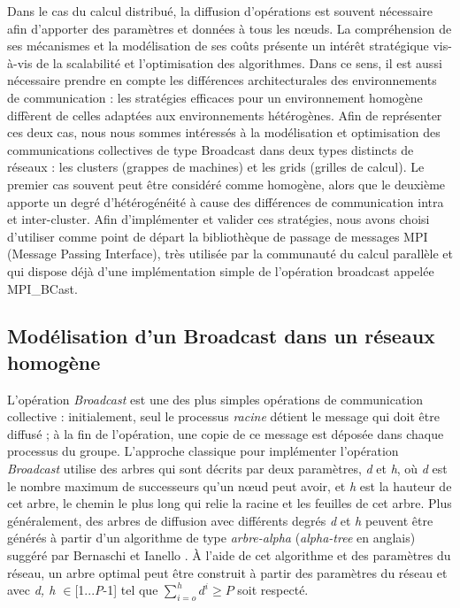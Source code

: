 Dans le cas du calcul distribué, la diffusion d'opérations est souvent nécessaire afin d'apporter des paramètres et données à tous les n{\oe}uds.  La compréhension de ses mécanismes et la modélisation de ses coûts présente un intérêt stratégique vis-à-vis de la scalabilité et l'optimisation des algorithmes. Dans ce sens, il est aussi nécessaire prendre en compte les différences architecturales des environnements de communication : les stratégies efficaces pour un environnement homogène diffèrent de celles adaptées aux environnements hétérogènes. Afin de représenter ces deux cas, nous nous sommes intéressés à la modélisation et optimisation des communications collectives de type Broadcast dans deux types distincts de réseaux : les clusters (grappes de machines) et les grids (grilles de calcul). Le premier cas souvent peut être considéré comme homogène, alors que le deuxième apporte un degré d'hétérogénéité à cause des différences de communication intra et inter-cluster. Afin d'implémenter et valider ces stratégies, nous avons choisi d'utiliser comme point de départ la bibliothèque de passage de messages MPI (Message Passing Interface), très utilisée par la communauté du calcul parallèle et qui dispose déjà d'une implémentation simple de l'opération broadcast appelée MPI\_BCast.   

\subsection{\label{sec:Broadcast}Modélisation d'un Broadcast dans un réseaux homogène}

L'opération \emph{Broadcast} est une des plus simples opérations de
communication collective : initialement, seul le processus \emph{racine}
détient le message qui doit être diffusé ; à la fin de l'opération,
une copie de ce message est déposée dans chaque processus du groupe.
L'approche classique pour implémenter l'opération \emph{Broadcast} utilise
des arbres qui sont décrits par deux paramètres, \emph{d} et \emph{h},
où \emph{d} est le nombre maximum de successeurs qu'un n{\oe}ud peut
avoir, et \emph{h} est la hauteur de cet arbre, le chemin le plus
long qui relie la racine et les feuilles de cet arbre. Plus généralement,
des arbres de diffusion avec différents degrés \emph{d} et \emph{h}
peuvent être générés à partir d'un algorithme de type \emph{arbre-alpha}
(\emph{alpha-tree} en anglais) suggéré par Bernaschi et Ianello \cite{Bernaschi98}.
À l'aide de cet algorithme et des paramètres du réseau, un arbre optimal
peut être construit à partir des paramètres du réseau et avec \emph{d,
	h $\in$}{[}1...\emph{P}-1] tel que $\sum_{i=o}^{h}d^{i}\geq P$ soit
respecté. %

